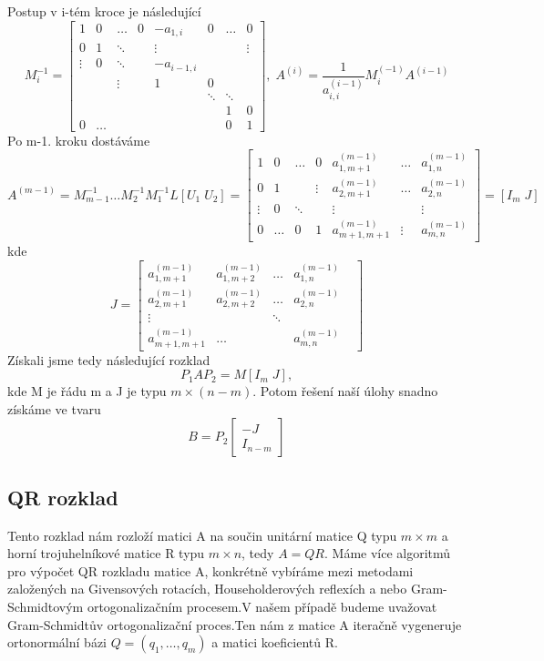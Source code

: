 \documentclass{article}
\theoremstyle{plain}
\theoremstyle{definition}
\begin{document}
Postup v i-tém kroce je následující
\[
M_i^{-1} = \begin{bmatrix}
    1 & 0 & \hdots & 0 & -a_{1,i}&0 &\hdots & 0 \\
    0 & 1 & \ddots & & \vdots & & & \vdots   \\
    \vdots & 0 & \ddots & & -a_{i-1,i} & & \\
    & & \vdots & & 1 & 0 & \\
    & & & & & \ddots & \ddots& \\
    & & & & & & 1 & 0 \\
    0& \hdots & & & & & 0 & 1
\end{bmatrix}, \; A^{(i)} = \frac{1}{a_{i,i}^{(i-1)}}M_i^{(-1)}A^{(i-1)}
\]
Po m-1. kroku dostáváme
\[ A^{(m-1)} = M_{m-1}^{-1} \hdots M_2^{-1}M_1^{-1}L[U_1\; U_2] = \begin{bmatrix}
    1 & 0 & \hdots & 0 & a_{1,m+1}^{(m-1)} & \hdots & a_{1,n}^{(m-1)} \\
    0 & 1 & & \vdots & a_{2,m+1}^{(m-1)} & \hdots & a_{2,n}^{(m-1)} \\
    \vdots & 0 & \ddots & & \vdots & & \vdots \\
    0 & \hdots & 0 & 1 & a_{m+1,m+1}^{(m-1)} & \vdots & a_{m,n}^{(m-1)}
\end{bmatrix}
= [I_m \; J]
\]
kde
\[J=\begin{bmatrix}
    a_{1,m+1}^{(m-1)} & a_{1,m+2}^{(m-1)} & \hdots & a_{1,n}^{(m-1)} \\
    a_{2,m+1}^{(m-1)} & a_{2,m+2}^{(m-1)} & \hdots & a_{2,n}^{(m-1)} \\
    \vdots & &\ddots & & \\
    a_{m+1,m+1}^{(m-1)}& \hdots & & a_{m,n}^{(m-1)}
\end{bmatrix}
\]
Získali jsme tedy následující rozklad 
\[ P_1 A P_2 = M [I_m \; J]
,\]
kde M je řádu m a J je typu $m \times (n-m)$. Potom řešení naší úlohy snadno získáme ve tvaru
\[ B = P_2 \begin{bmatrix}
    -J\\
    I_{n-m}
\end{bmatrix}
\]

\newpage

\subsection{QR rozklad}
Tento rozklad nám rozloží matici A na součin unitární matice Q typu $m \times m$ a horní trojuhelníkové matice R typu $m \times n$, tedy $A=QR.$
Máme více algoritmů pro výpočet QR rozkladu matice A, konkrétně vybíráme mezi metodami založených na Givensových rotacích, Householderových reflexích a nebo Gram-Schmidtovým ortogonalizačním procesem.V našem případě budeme uvažovat Gram-Schmidtův ortogonalizační proces.Ten nám z matice A iteračně vygeneruje ortonormální bázi $Q=(q_1,\hdots,q_m)$ a matici koeficientů R.
\end{document}
